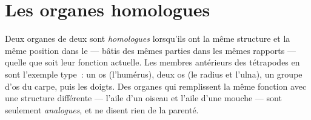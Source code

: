 \section{Les organes homologues}

\begin{definition}[Homologie]\label{def:g10:common-ancestry:homology}
Deux organes de deux  sont \emph{homologues}
lorsqu'ils ont la même structure et la même position dans le  --- bâtis des mêmes parties dans les mêmes rapports ---
quelle que soit leur fonction actuelle. Les membres antérieurs des
tétrapodes en sont l'exemple type~: un os (l'humérus), deux os (le
radius et l'ulna), un groupe d'os du carpe, puis les doigts. Des
organes qui remplissent la même fonction avec une structure différente
--- l'aile d'un oiseau et l'aile d'une mouche --- sont seulement
\emph{analogues}, et ne disent rien de la parenté.
\end{definition}

